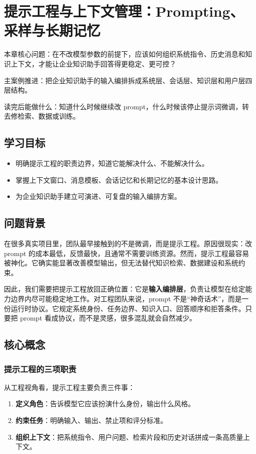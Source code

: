 \chapter{提示工程与上下文管理：Prompting、采样与长期记忆}

\begin{introduction}
\item {\heiti 本章核心问题}：在不改模型参数的前提下，应该如何组织系统指令、历史消息和知识上下文，才能让企业知识助手回答得更稳定、更可控？
\item {\heiti 主案例推进}：把企业知识助手的输入编排拆成系统层、会话层、知识层和用户层四层结构。
\item {\heiti 读完后能做什么}：知道什么时候继续改 prompt，什么时候该停止提示词微调，转去修检索、数据或训练。
\end{introduction}

\section{学习目标}
\begin{itemize}
  \item 明确提示工程的职责边界，知道它能解决什么、不能解决什么。
  \item 掌握上下文窗口、消息模板、会话记忆和长期记忆的基本设计思路。
  \item 为企业知识助手建立可演进、可复盘的输入编排方案。
\end{itemize}

\section{问题背景}
在很多真实项目里，团队最早接触到的不是微调，而是提示工程。原因很现实：改 prompt 的成本最低，反馈最快，且通常不需要训练资源。然而，提示工程最容易被神化。它确实能显著改善模型输出，但无法替代知识检索、数据建设和系统约束。

因此，我们需要把提示工程放回正确位置：它是\textbf{输入编排层}，负责让模型在给定能力边界内尽可能稳定地工作。对工程团队来说，prompt 不是“神奇话术”，而是一份运行时协议。它规定系统身份、任务边界、知识入口、回答顺序和拒答条件。只要把 prompt 看成协议，而不是灵感，很多混乱就会自然减少。

\section{核心概念}
\subsection{提示工程的三项职责}
从工程视角看，提示工程主要负责三件事：
\begin{enumerate}
  \item \textbf{定义角色}：告诉模型它应该扮演什么身份，输出什么风格。
  \item \textbf{约束任务}：明确输入、输出、禁止项和评分标准。
  \item \textbf{组织上下文}：把系统指令、用户问题、检索片段和历史对话拼成一条高质量上下文。
\end{enumerate}

